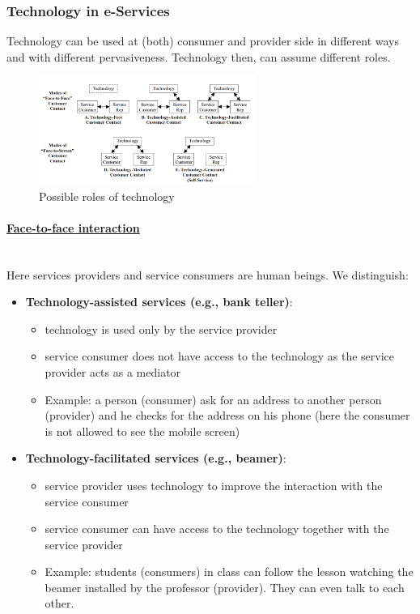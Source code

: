 \documentclass[10pt,a4paper]{article}
\newcommand{\myparagraph}[1]{\paragraph{\uline{#1}}\mbox{}\\[0.05in]}
\begin{document}
\subsubsection{Technology in e-Services}
Technology can be used at (both) consumer and provider side in different ways and with different pervasiveness. Technology then, can assume different roles.
\begin{figure}[h!]
 \hfill \includegraphics[width=200pt]{images/roles-tech}\hspace*{\fill}
 \caption{Possible roles of technology}
  \label{fig:roles-tech}
\end{figure}
\myparagraph{Face-to-face interaction}
Here services providers and service consumers are human beings. We distinguish:
\begin{itemize}
	\item \textbf{Technology-assisted services (e.g., bank teller)}:
	\begin{itemize}
		\item technology is used only by the service provider
		\item service consumer does not have access to the technology as the service provider acts as a mediator
		\item Example: a person (consumer) ask for an address to another person (provider) and he checks for the address on his phone (here the consumer is not allowed to see the mobile screen)
	\end{itemize}
	\item \textbf{Technology-facilitated services (e.g., beamer)}:
		\begin{itemize}
		\item service provider uses technology to improve the interaction with the service consumer
		\item service consumer can have access to the technology together with the service provider
		\item Example: students (consumers) in class can follow the lesson watching the beamer installed by the professor (provider). They can even talk to each other.
	\end{itemize}
\end{itemize}
\end{document}
